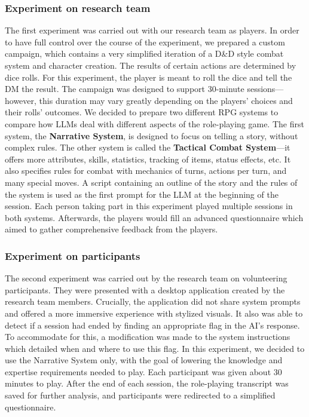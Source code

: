 \documentclass[runningheads]{llncs}
\begin{document}
\subsubsection{Experiment on research team}
The first experiment was carried out with our research team as players. In order to have full control over the course of the experiment, we prepared a custom campaign, which contains a very simplified iteration of a D\&D style combat system and character creation. The results of certain actions are determined by dice rolls. For this experiment, the player is meant to roll the dice and tell the DM the result. The campaign was designed to support 30-minute sessions---however, this duration may vary greatly depending on the players' choices and their rolls' outcomes. We decided to prepare two different RPG systems to compare how LLMs deal with different aspects of the role-playing game. The first system, the \textbf{Narrative System}, is designed to focus on telling a story, without complex rules. The other system is called the \textbf{Tactical Combat System}---it offers more attributes, skills, statistics, tracking of items, status effects, etc. It also specifies rules for combat with mechanics of turns, actions per turn, and many special moves. A script containing an outline of the story and the rules of the system is used as the first prompt for the LLM at the beginning of the session. Each person taking part in this experiment played multiple sessions in both systems. Afterwards, the players would fill an advanced questionnaire which aimed to gather comprehensive feedback from the players. 

\subsubsection{Experiment on participants}
The second experiment was carried out by the research team on volunteering participants. They were presented with a desktop application created by the research team members. Crucially, the application did not share system prompts and offered a more immersive experience with stylized visuals. It also was able to detect if a session had ended by finding an appropriate flag in the AI's response. To accommodate for this, a modification was made to the system instructions which detailed when and where to use this flag. In this experiment, we decided to use the Narrative System only, with the goal of lowering the knowledge and expertise requirements needed to play. Each participant was given about 30 minutes to play. After the end of each session, the role-playing transcript was saved for further analysis, and participants were redirected to a simplified questionnaire. 
\end{document}
